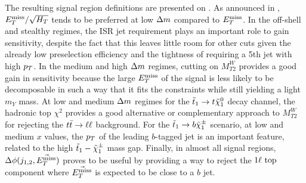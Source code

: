     The resulting signal region definitions are presented on .
    As announced in , $E_T^\text{miss}/\sqrt{H_T}$ tends to be
    preferred at low $\Delta m$ compared to $E_T^\text{miss}$. In the off-shell and stealthy regimes,
    the ISR jet requirement plays an important role to gain sensitivity, despite the
    fact that this leaves little room for other cuts given the already low preselection
    efficiency and the tightness of requiring a 5th jet with high $p_T$.
    In the medium and high $\Delta m$ regimes, cutting on $M_{T2}^W$ provides a good gain
    in sensitivity because the large $E_T^\text{miss}$ of the signal is less likely to be decomposable
    in such a way that it fits the constraints while still yielding a light $m_Y$ mass.
    At low and medium $\Delta m$ regimes for the $\tilde{t}_1 \rightarrow t \tilde{\chi}_1^0$ decay channel, the
    hadronic top $\chi^2$ provides a good alternative or complementary approach to $M_{T2}^{W}$
    for rejecting the $t\bar{t} \rightarrow \ell \ell$ background. For the $\tilde{t}_1 \rightarrow b \tilde{\chi}_1^\pm$ scenario,
    at low and medium $x$ values, the $p_T$ of the leading $b$-tagged jet is an important
    feature, related to the high $\tilde{t}_1-\tilde{\chi}_1^\pm$ mass gap. Finally, in almost all signal regions,
    $\Delta\phi(j_{1,2},\vec{E_T^\text{miss}})$ proves to be useful by providing a way to reject the
    $1\ell~\text{top}$ component where $\vec{E_T^\text{miss}}$ is expected to be close to a $b$ jet.

